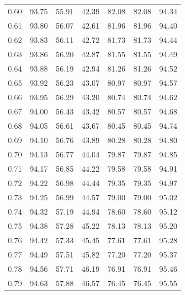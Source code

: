 \begin{tabular}{|c|c|c|c|c|c|c|}
      0.60 &     93.75 &     55.91 &      42.39 &   82.08 &      82.08 &         94.34 \\
      0.61 &     93.80 &     56.07 &      42.61 &   81.96 &      81.96 &         94.40 \\
      0.62 &     93.83 &     56.11 &      42.72 &   81.73 &      81.73 &         94.44 \\
      0.63 &     93.86 &     56.20 &      42.87 &   81.55 &      81.55 &         94.49 \\
      0.64 &     93.88 &     56.19 &      42.94 &   81.26 &      81.26 &         94.52 \\
      0.65 &     93.92 &     56.23 &      43.07 &   80.97 &      80.97 &         94.57 \\
      0.66 &     93.95 &     56.29 &      43.20 &   80.74 &      80.74 &         94.62 \\
      0.67 &     94.00 &     56.43 &      43.42 &   80.57 &      80.57 &         94.68 \\
      0.68 &     94.05 &     56.61 &      43.67 &   80.45 &      80.45 &         94.74 \\
      0.69 &     94.10 &     56.76 &      43.89 &   80.28 &      80.28 &         94.80 \\
      0.70 &     94.13 &     56.77 &      44.04 &   79.87 &      79.87 &         94.85 \\
      0.71 &     94.17 &     56.85 &      44.22 &   79.58 &      79.58 &         94.91 \\
      0.72 &     94.22 &     56.98 &      44.44 &   79.35 &      79.35 &         94.97 \\
      0.73 &     94.25 &     56.99 &      44.57 &   79.00 &      79.00 &         95.02 \\
      0.74 &     94.32 &     57.19 &      44.94 &   78.60 &      78.60 &         95.12 \\
      0.75 &     94.38 &     57.28 &      45.22 &   78.13 &      78.13 &         95.20 \\
      0.76 &     94.42 &     57.33 &      45.45 &   77.61 &      77.61 &         95.28 \\
      0.77 &     94.49 &     57.51 &      45.82 &   77.20 &      77.20 &         95.37 \\
      0.78 &     94.56 &     57.71 &      46.19 &   76.91 &      76.91 &         95.46 \\
      0.79 &     94.63 &     57.88 &      46.57 &   76.45 &      76.45 &         95.55 \\

\end{tabular}
